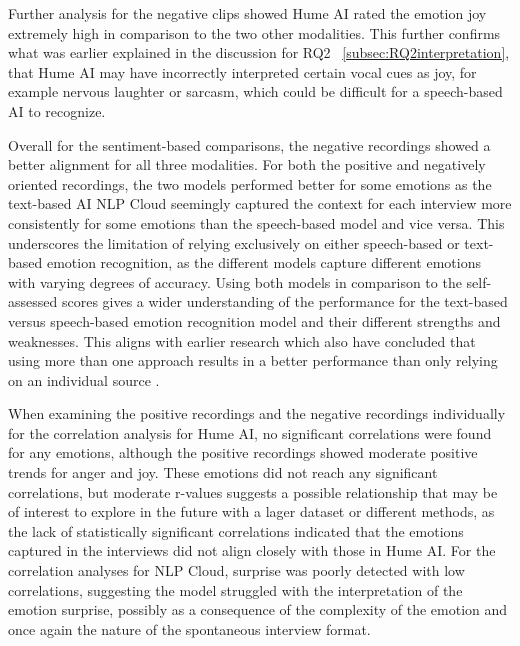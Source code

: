 Further analysis for the negative clips showed Hume AI rated the emotion joy extremely high in comparison to the two other modalities. This further confirms what was earlier explained in the discussion for RQ2 ~\ref{subsec:RQ2interpretation}, that Hume AI may have incorrectly interpreted certain vocal cues as joy, for example nervous laughter or sarcasm, which could be difficult for a speech-based AI to recognize.

Overall for the sentiment-based comparisons, the negative recordings showed a better alignment for all three modalities. For both the positive and negatively oriented recordings, the two models performed better for some emotions as the text-based AI NLP Cloud seemingly captured the context for each interview more consistently for some emotions than the speech-based model and vice versa. This underscores the limitation of relying exclusively on either speech-based or text-based emotion recognition, as the different models capture different emotions with varying degrees of accuracy. Using both models in comparison to the self-assessed scores gives a wider understanding of the performance for the text-based versus speech-based emotion recognition model and their different strengths and weaknesses. This aligns with earlier research which also have concluded that using more than one approach results in a better performance than only relying on an individual source \autocite{Cao2015}.

When examining the positive recordings and the negative recordings individually for the correlation analysis for Hume AI, no significant correlations were found for any emotions, although the positive recordings showed moderate positive trends for anger and joy. These emotions did not reach any significant correlations, but moderate r-values suggests a possible relationship that may be of interest to explore in the future with a lager dataset or different methods, as the lack of statistically significant correlations indicated that the emotions captured in the interviews did not align closely with those in Hume AI. 
For the correlation analyses for NLP Cloud, surprise was poorly detected with low correlations, suggesting the model struggled with the interpretation of the emotion surprise, possibly as a consequence of the complexity of the emotion and once again the nature of the spontaneous interview format.


